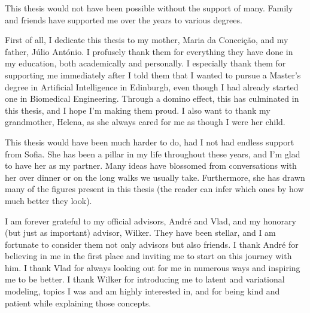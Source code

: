 \begin{acknowledgments}

    This thesis would not have been possible without the support of
    many. Family and friends have supported me over
    the years to various degrees.
    
    First of all, I dedicate this thesis to my mother, Maria da
    Conceição, and my father, Júlio António. I profusely thank them
    for everything they have done in my education, both academically
    and personally. I especially thank them for supporting me
    immediately after I told them that I wanted to pursue a Master's
    degree in Artificial Intelligence in Edinburgh, even though I had
    already started one in Biomedical Engineering. Through a domino
    effect, this has culminated in this thesis, and I hope I'm making
    them proud. I also want to thank my grandmother, Helena, as she
    always cared for me as though I were her child.
    
    This thesis would have been much harder to do, had I not had
    endless support from Sofia. She has been a pillar in my life
    throughout these years, and I'm glad to have her as my partner.
    Many ideas have blossomed from conversations with her over dinner
    or on the long walks we usually take. Furthermore, she has drawn
    many of the figures present in this thesis (the reader can infer
    which ones by how much better they look).
    
    I am forever grateful to my official advisors, André and Vlad,
    and my honorary (but just as important) advisor, Wilker. They
    have been stellar, and I am fortunate to consider them not only
    advisors but also friends. I thank André for believing in me in
    the first place and inviting me to start on this journey with
    him. I thank Vlad for always looking out for me in numerous ways
    and inspiring me to be better. I thank Wilker for introducing me
    to latent and variational modeling, topics I was and am highly
    interested in, and for being kind and patient while explaining
    those concepts.
    

\end{acknowledgments}
